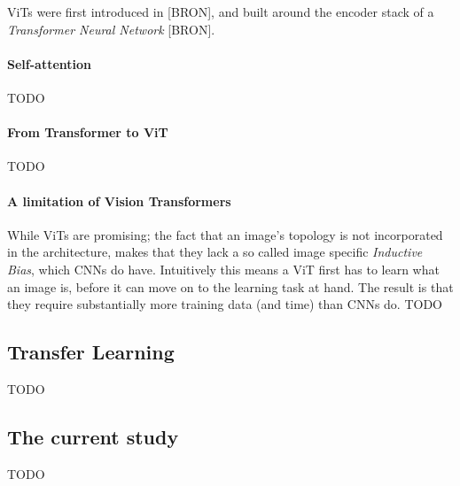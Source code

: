 ViTs were first introduced in [BRON], and built around the encoder stack of a \textit{Transformer Neural Network} [BRON].

\paragraph{Self-attention}
TODO

\paragraph{From Transformer to ViT}
TODO


\paragraph{A limitation of Vision Transformers}
While ViTs are promising; the fact that an image's topology is not incorporated in the architecture, makes that they lack a so called image specific \textit{Inductive Bias}, which CNNs do have. Intuitively this means a ViT first has to learn what an image is, before it can move on to the learning task at hand. The result is that they require substantially more training data (and time) than CNNs do. 
TODO


\subsection{Transfer Learning}
TODO

\subsection{The current study}
TODO
